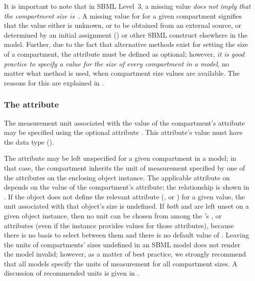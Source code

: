 It is important to note that in SBML Level~3, a missing
 value \emph{does not imply that the compartment size
  is~}.  A missing value for  for a given
compartment signifies that the value either is unknown, or to be
obtained from an external source, or determined by an initial
assignment () or other SBML
construct elsewhere in the model.  Further, due to the fact that
alternative methods exist for setting the size of a
compartment, the  attribute must be defined as
optional; however, \emph{it is good practice to specify a value
for the size of every compartment in a model}, no matter what method
is used, when compartment size values are available.  The reasons
for this are explained in .


\subsubsection{The  attribute}
\label{sec:compartment-units}

The measurement unit associated with the value of the
compartment's  attribute may be specified using the
optional attribute .  This attribute's value must
have the data type 
().

The  attribute may be left unspecified for a given
compartment in a model; in that case, the compartment inherits the
unit of measurement specified by one of the attributes on the
enclosing \Model object instance.  The applicable attribute on
\Model depends on the value of the compartment's
 attribute; the relationship is shown in
.  If the \Model object does not
define the relevant attribute (,
 or ) for a given
 value, the unit associated with that
\Compartment object's size is undefined.  If \emph{both}
 and  are left unset on a
given \Compartment object instance, then no unit can be chosen
from among the \Model's ,  or
 attributes (even if the \Model instance
provides values for those attributes), because there is no basis
to select between them and there is no default value of
.  Leaving the units of compartments'
sizes undefined in an SBML model does not render the model
invalid; however, as a matter of best practice, we strongly
recommend that all models specify the units of measurement for all
compartment sizes.  A discussion of recommended units is given in
.
  
